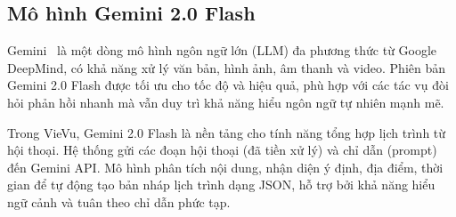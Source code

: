 


\subsection{Mô hình Gemini 2.0 Flash}
\label{subsec:gemini_model}

Gemini~\cite{gemini_google_blog} là một dòng mô hình ngôn ngữ lớn (LLM) đa phương thức từ Google DeepMind, có khả năng xử lý văn bản, hình ảnh, âm thanh và video. Phiên bản Gemini 2.0 Flash được tối ưu cho tốc độ và hiệu quả, phù hợp với các tác vụ đòi hỏi phản hồi nhanh mà vẫn duy trì khả năng hiểu ngôn ngữ tự nhiên mạnh mẽ.

Trong VieVu, Gemini 2.0 Flash là nền tảng cho tính năng tổng hợp lịch trình từ hội thoại. Hệ thống gửi các đoạn hội thoại (đã tiền xử lý) và chỉ dẫn (prompt) đến Gemini API. Mô hình phân tích nội dung, nhận diện ý định, địa điểm, thời gian để tự động tạo bản nháp lịch trình dạng JSON, hỗ trợ bởi khả năng hiểu ngữ cảnh và tuân theo chỉ dẫn phức tạp.

